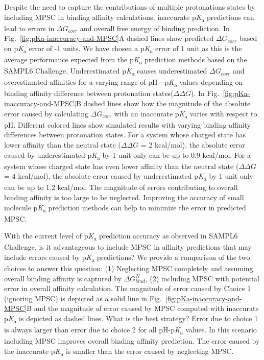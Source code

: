 \documentclass[9pt,lineno,final]{elife}
\newcommand{\pKa}{p\textit{K}\textsubscript{a}}
\begin{document}
Despite the need to capture the contributions of multiple protonations states by including MPSC in binding affinity calculations, inaccurate \pKa{} predictions can lead to errors in $\Delta G_{corr}$  and overall free energy of binding prediction. In Fig.~\ref{fig:pKa-inaccuracy-and-MPSC}A dashed lines show predicted $\Delta G_{corr}$ based on \pKa{} error of -1 units. We have chosen a \pKa{} error of 1 unit as this is the average performance expected from the \pKa{} prediction methods based on the SAMPL6 Challenge. Underestimated \pKa{} causes underestimated $\Delta G_{corr}$ and overestimated affinities for a varying range of pH - \pKa{} values depending on binding affinity difference between protonation states($\Delta\Delta G$).
In Fig.~\ref{fig:pKa-inaccuracy-and-MPSC}B dashed lines show how the magnitude of the absolute error caused by calculating $\Delta G_{corr}$ with an inaccurate \pKa{} varies with respect to pH. Different colored lines show simulated results with varying binding affinity differences between protonation states. For a system whose charged state has lower affinity than the neutral state ($\Delta\Delta G$ = 2 kcal/mol), the absolute error caused by underestimated \pKa{} by 1 unit only can be up to 0.9 kcal/mol.
For a system whose charged state has even lower affinity than the neutral state ($\Delta\Delta G$ = 4 kcal/mol), the absolute error caused by underestimated \pKa{} by 1 unit only can be up to 1.2 kcal/mol.
The magnitude of errors contributing to overall binding affinity is too large to be neglected. Improving the accuracy of small molecule \pKa{} prediction methods can help to minimize the error in predicted MPSC.

With the current level of \pKa{} prediction accuracy as observed in SAMPL6 Challenge, is it advantageous to include MPSC in affinity predictions that may include errors caused by \pKa{} predictions? We provide a comparison of the two choices to answer this question: (1) Neglecting MPSC completely and assuming overall binding affinity is captured by $\Delta G_{bind}^{N}$, (2) including MPSC with potential error in overall affinity calculation. The magnitude of error caused by Choice 1 (ignoring MPSC) is depicted as a solid line in Fig.~\ref{fig:pKa-inaccuracy-and-MPSC}B and the magnitude of error caused by MPSC computed with inaccurate \pKa{}  is depicted as dashed lines. What is the best strategy? Error due to choice 1 is always larger than error due to choice 2 for all pH-\pKa{} values. In this scenario including MPSC improves overall binding affinity prediction. The error caused by the inaccurate \pKa{} is smaller than the error caused by neglecting MPSC. 
\end{document}
